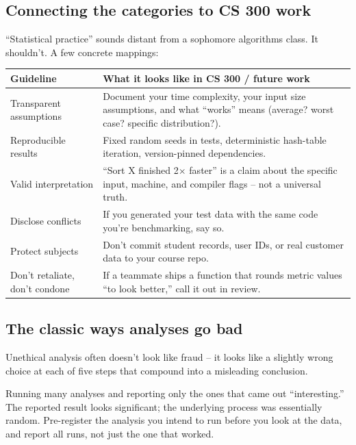 \documentclass[11pt]{article}
\begin{document}
\subsection{Connecting the categories to CS 300 work}

``Statistical practice'' sounds distant from a sophomore algorithms
class. It shouldn't. A few concrete mappings:

\begin{center}
\small
\begin{tabular}{p{5cm} p{7cm}}
\textbf{Guideline} & \textbf{What it looks like in CS 300 / future work} \\
\hline
Transparent assumptions & Document your time complexity, your input
size assumptions, and what ``works'' means (average? worst case?
specific distribution?). \\
Reproducible results & Fixed random seeds in tests, deterministic
hash-table iteration, version-pinned dependencies. \\
Valid interpretation & ``Sort X finished 2$\times$ faster'' is a
claim about the specific input, machine, and compiler flags --
not a universal truth. \\
Disclose conflicts & If you generated your test data with the same
code you're benchmarking, say so. \\
Protect subjects & Don't commit student records, user IDs, or real
customer data to your course repo. \\
Don't retaliate, don't condone & If a teammate ships a function
that rounds metric values ``to look better,'' call it out in
review. \\
\end{tabular}
\normalsize
\end{center}

\subsection{The classic ways analyses go bad}

Unethical analysis often doesn't look like fraud -- it looks like a
slightly wrong choice at each of five steps that compound into a
misleading conclusion.

\begin{warnbox}
Running many analyses and reporting only the ones that came out
``interesting.'' The reported result looks significant; the
underlying process was essentially random. Pre-register the analysis
you intend to run before you look at the data, and report all runs,
not just the one that worked.
\end{warnbox}
\end{document}
